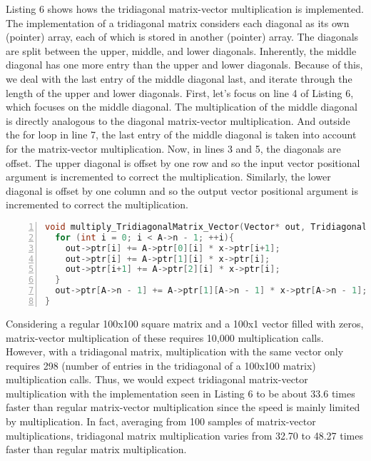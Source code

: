 \documentclass{article}
\begin{document}
Listing 6 shows hows the tridiagonal matrix-vector multiplication is implemented. The implementation of a tridiagonal matrix considers each diagonal as its own (pointer) array, each of which is stored in another (pointer) array. The diagonals are split between the upper, middle, and lower diagonals. Inherently, the middle diagonal has one more entry than the upper and lower diagonals. Because of this, we deal with the last entry of the middle diagonal last, and iterate through the length of the upper and lower diagonals. First, let's focus on line 4 of Listing 6, which focuses on the middle diagonal. The multiplication of the middle diagonal is directly analogous to the diagonal matrix-vector multiplication. And outside the for loop in line 7, the last entry of the middle diagonal is taken into account for the matrix-vector multiplication. Now, in lines 3 and 5, the diagonals are offset. The upper diagonal is offset by one row and so the input vector positional argument is incremented to correct the multiplication. Similarly, the lower diagonal is offset by one column and so the output vector positional argument is incremented to correct the multiplication.

\begin{lstlisting}[language=C, basicstyle=\ttfamily, numbers=left , caption={Tridiagonal Matrix-Vector Multiplication Implementation.}]
void multiply_TridiagonalMatrix_Vector(Vector* out, TridiagonalMatrix* A, Vector* x){
  for (int i = 0; i < A->n - 1; ++i){
    out->ptr[i] += A->ptr[0][i] * x->ptr[i+1];
    out->ptr[i] += A->ptr[1][i] * x->ptr[i];
    out->ptr[i+1] += A->ptr[2][i] * x->ptr[i];
  }
  out->ptr[A->n - 1] += A->ptr[1][A->n - 1] * x->ptr[A->n - 1];
}
\end{lstlisting}

Considering a regular 100x100 square matrix and a 100x1 vector filled with zeros, matrix-vector multiplication of these requires 10,000 multiplication calls. However, with a tridiagonal matrix, multiplication with the same vector only requires 298 (number of entries in the tridiagonal of a 100x100 matrix) multiplication calls. Thus, we would expect tridiagonal matrix-vector multiplication with the implementation seen in Listing 6 to be about 33.6 times faster than regular matrix-vector multiplication since the speed is mainly limited by multiplication. In fact, averaging from 100 samples of matrix-vector multiplications, tridiagonal matrix multiplication varies from 32.70 to 48.27 times faster than regular matrix multiplication.
\end{document}
